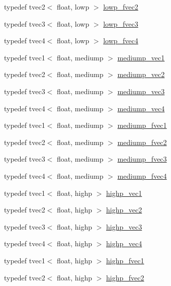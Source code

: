 \begin{DoxyCompactItemize}
\item 
typedef tvec2$<$ float, lowp $>$ \hyperlink{namespaceglm_aa6bc4e1213ddd2faeec466bdc4b93711}{lowp\+\_\+fvec2}
\item 
typedef tvec3$<$ float, lowp $>$ \hyperlink{namespaceglm_ae5d208494ff088d05d8d9891f1983af8}{lowp\+\_\+fvec3}
\item 
typedef tvec4$<$ float, lowp $>$ \hyperlink{namespaceglm_a243b3e1a29e946252ca074dfdf87459b}{lowp\+\_\+fvec4}
\item 
typedef tvec1$<$ float, mediump $>$ \hyperlink{namespaceglm_a1b734d715033ab3026b2fb27e1fb7d3e}{mediump\+\_\+vec1}
\item 
typedef tvec2$<$ float, mediump $>$ \hyperlink{namespaceglm_af68118a5464fb85765141f62b5894531}{mediump\+\_\+vec2}
\item 
typedef tvec3$<$ float, mediump $>$ \hyperlink{namespaceglm_a728b91412ec763dbb53bb6545506da7c}{mediump\+\_\+vec3}
\item 
typedef tvec4$<$ float, mediump $>$ \hyperlink{namespaceglm_aef62daee3ded964134c0f959102182e8}{mediump\+\_\+vec4}
\item 
typedef tvec1$<$ float, mediump $>$ \hyperlink{namespaceglm_a3fd73c0c1d435f6236f759337353a4ee}{mediump\+\_\+fvec1}
\item 
typedef tvec2$<$ float, mediump $>$ \hyperlink{namespaceglm_aeb4a9a86b1932957717a9aa118da91dd}{mediump\+\_\+fvec2}
\item 
typedef tvec3$<$ float, mediump $>$ \hyperlink{namespaceglm_a3a6858b762ae37a54a04632719abf368}{mediump\+\_\+fvec3}
\item 
typedef tvec4$<$ float, mediump $>$ \hyperlink{namespaceglm_a4054e80ce187977ed0b307a53d0c0dcd}{mediump\+\_\+fvec4}
\item 
typedef tvec1$<$ float, highp $>$ \hyperlink{namespaceglm_ab3f08c031846e7a95b49e81c48d920d3}{highp\+\_\+vec1}
\item 
typedef tvec2$<$ float, highp $>$ \hyperlink{namespaceglm_ad48b331956b3890e02bf05a028d4869e}{highp\+\_\+vec2}
\item 
typedef tvec3$<$ float, highp $>$ \hyperlink{namespaceglm_aea8953aeddfe3db55125a8ae05c01ed0}{highp\+\_\+vec3}
\item 
typedef tvec4$<$ float, highp $>$ \hyperlink{namespaceglm_a6148057fcc4a05698e2114d89bf863f1}{highp\+\_\+vec4}
\item 
typedef tvec1$<$ float, highp $>$ \hyperlink{namespaceglm_a759ec470a820ed3c0968790d20426020}{highp\+\_\+fvec1}
\item 
typedef tvec2$<$ float, highp $>$ \hyperlink{namespaceglm_a7626c78159b590e2db6b8a8e4c2ea655}{highp\+\_\+fvec2}

\end{DoxyCompactItemize}
